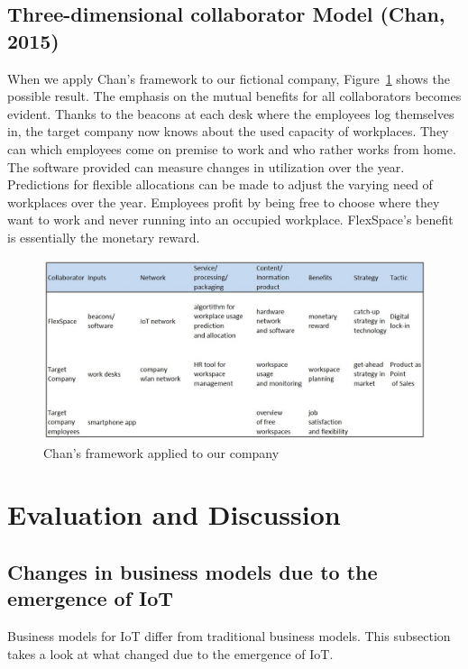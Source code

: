 	\subsection{Three-dimensional collaborator Model (Chan, 2015)}

		When we apply Chan's framework to our fictional company, Figure~\ref{use case chan} shows the possible result. The emphasis on the mutual benefits for all collaborators becomes evident. Thanks to the beacons at each desk where the employees log themselves in, the target company now knows about the used capacity of workplaces. They can which employees come on premise to work and who rather works from home. The software provided can measure changes in utilization over the year. Predictions for flexible allocations can be made to adjust the varying need of workplaces over the year. Employees profit by being free to choose where they want to work and never running into an occupied workplace. FlexSpace's benefit is essentially the monetary reward.

		\begin{figure}[ht]
		    \begin{center}
		    \includegraphics[scale=0.55]{Talk11/chanexampleusecase.jpg}
		    \end{center}
		    \caption{Chan's framework applied to our company}
		    \label{use case chan}
	    \end{figure}

\section{Evaluation and Discussion}
\label{sec:eval}

	\subsection{Changes in business models due to the emergence of IoT}
		Business models for IoT differ from traditional business models. This subsection takes a look at what changed due to the emergence of IoT.

